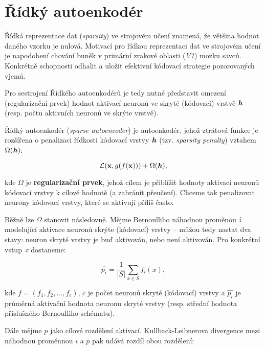 \section{Řídký autoenkodér}
\label{sec:sparse_autoencoder}
Řídká reprezentace dat (\emph{sparsity}) ve strojovém učení znamená, že většina hodnot daného vzorku je nulová. 
Motivací pro řídkou reprezentaci dat ve strojovém učení je napodobení chování buněk v primární zrakové oblasti (\emph{V1}) mozku savců.
Konkrétně schopnosti odhalit a uložit efektivní kódovací strategie pozorovaných vjemů. \cite{Olshausen1997}

Pro sestrojení Řídkého autoenkodérů je tedy nutné představit omezení (regularizační prvek) hodnot aktivací neuronů ve skryté (kódovací) vrstvě $\textbf{\emph{h}}$ (resp. počtu aktivních neuronů ve skrýte vrstvě).

Řídký autoenkodér (\emph{sparse autoencoder}) je autoenkodér, jehož ztrátová funkce je rozšířena o penalizaci řídkosti kódovací vrstvy $\textbf{\emph{h}}$ (tzv. \emph{sparsity penalty}) vztahem $\Omega(\textbf{\emph{h}})$:

\begin{equation}
    \mathcal{L}(\mathbf{x}, g(f(\mathbf{x}))) + \Omega(\textbf{\emph{h}}),
\end{equation}

kde $\Omega$ je \textbf{regularizační prvek}, jehož cílem je přiblížit hodnoty aktivací neuronů kódovací vrstvy k cílové hodnotě (a zabránit přeučení).
Chceme tak penalizovat neurony kódovací vrstvy, které se aktivují příliš často. \cite{Goodfellow2016}

Běžně lze $\Omega$ stanovit následovně. Mějme Bernoulliho náhodnou proměnou $\emph{i}$ modelující aktivace neuronů skrýte (kódovací) vrstvy – můžou tedy nastat dva stavy: neuron skryté vrstvy je buď aktivován, nebo není aktivován.
Pro konkrétní vstup $\emph{x}$ dostaneme:

\begin{equation}
    \hat{p_i} = \frac{1}{|S|}\sum_{x \in S}^{}f_i(x),
\end{equation}

kde $ f = (f_1, f_2, \dots, f_c)$, $c$ je počet neuronů skryté (kódovací) vrstvy a $\hat{p_i}$ je průměrná aktivační hodnota neuronu skryté vrstvy (resp. střední hodnota příslušného Bernoulliho schématu). \cite{Charte2018}

Dále mějme $p$ jako cílové rozdělení aktivací.
Kullback-Leibnerova divergence mezi náhodnou proměnnou $i$ a $p$ pak udává rozdíl obou rozdělení:

